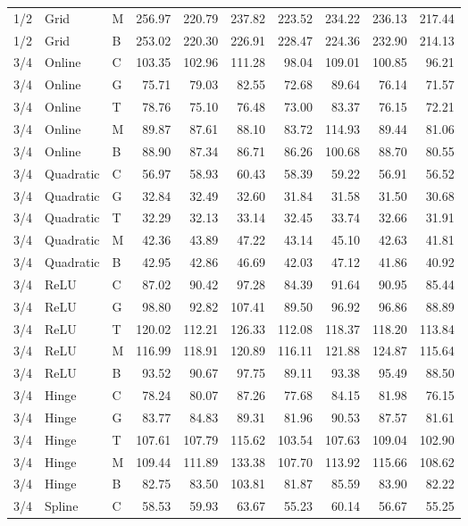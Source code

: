 \begin{longtable}{lllrrrrrrr}
1/2 & Grid & M & 256.97 & 220.79 & 237.82 & 223.52 & 234.22 & 236.13 & 217.44 \\
1/2 & Grid & B & 253.02 & 220.30 & 226.91 & 228.47 & 224.36 & 232.90 & 214.13 \\
3/4 & Online & C & 103.35 & 102.96 & 111.28 & 98.04 & 109.01 & 100.85 & 96.21 \\
3/4 & Online & G & 75.71 & 79.03 & 82.55 & 72.68 & 89.64 & 76.14 & 71.57 \\
3/4 & Online & T & 78.76 & 75.10 & 76.48 & 73.00 & 83.37 & 76.15 & 72.21 \\
3/4 & Online & M & 89.87 & 87.61 & 88.10 & 83.72 & 114.93 & 89.44 & 81.06 \\
3/4 & Online & B & 88.90 & 87.34 & 86.71 & 86.26 & 100.68 & 88.70 & 80.55 \\
3/4 & Quadratic & C & 56.97 & 58.93 & 60.43 & 58.39 & 59.22 & 56.91 & 56.52 \\
3/4 & Quadratic & G & 32.84 & 32.49 & 32.60 & 31.84 & 31.58 & 31.50 & 30.68 \\
3/4 & Quadratic & T & 32.29 & 32.13 & 33.14 & 32.45 & 33.74 & 32.66 & 31.91 \\
3/4 & Quadratic & M & 42.36 & 43.89 & 47.22 & 43.14 & 45.10 & 42.63 & 41.81 \\
3/4 & Quadratic & B & 42.95 & 42.86 & 46.69 & 42.03 & 47.12 & 41.86 & 40.92 \\
3/4 & ReLU & C & 87.02 & 90.42 & 97.28 & 84.39 & 91.64 & 90.95 & 85.44 \\
3/4 & ReLU & G & 98.80 & 92.82 & 107.41 & 89.50 & 96.92 & 96.86 & 88.89 \\
3/4 & ReLU & T & 120.02 & 112.21 & 126.33 & 112.08 & 118.37 & 118.20 & 113.84 \\
3/4 & ReLU & M & 116.99 & 118.91 & 120.89 & 116.11 & 121.88 & 124.87 & 115.64 \\
3/4 & ReLU & B & 93.52 & 90.67 & 97.75 & 89.11 & 93.38 & 95.49 & 88.50 \\
3/4 & Hinge & C & 78.24 & 80.07 & 87.26 & 77.68 & 84.15 & 81.98 & 76.15 \\
3/4 & Hinge & G & 83.77 & 84.83 & 89.31 & 81.96 & 90.53 & 87.57 & 81.61 \\
3/4 & Hinge & T & 107.61 & 107.79 & 115.62 & 103.54 & 107.63 & 109.04 & 102.90 \\
3/4 & Hinge & M & 109.44 & 111.89 & 133.38 & 107.70 & 113.92 & 115.66 & 108.62 \\
3/4 & Hinge & B & 82.75 & 83.50 & 103.81 & 81.87 & 85.59 & 83.90 & 82.22 \\
3/4 & Spline & C & 58.53 & 59.93 & 63.67 & 55.23 & 60.14 & 56.67 & 55.25 \\

\end{longtable}
